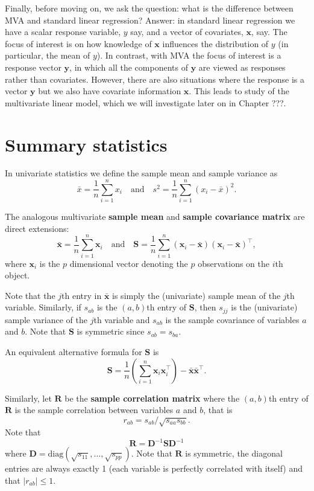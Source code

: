 \documentclass[]{book}
\theoremstyle{definition}
\theoremstyle{definition}
\theoremstyle{definition}
\theoremstyle{remark}
\begin{document}
Finally, before moving on, we ask the question: what is the difference between MVA and standard linear regression? Answer: in standard linear regression we have a scalar response variable, \(y\) say, and a vector of covariates, \(\boldsymbol x\), say. The focus of interest is on how knowledge of \(\boldsymbol x\) influences the distribution of \(y\) (in particular, the mean of \(y\)). In contrast, with MVA the focus of interest is a response vector \(\boldsymbol y\), in which all the components of \(\boldsymbol y\) are viewed as responses rather than covariates. However, there are also situations where the response is a vector \(\boldsymbol y\) but we also have covariate information \(\boldsymbol x\). This leads to study of the multivariate linear model, which we will investigate later on in Chapter ???.

\hypertarget{summary-statistics}{%
\section{Summary statistics}\label{summary-statistics}}

In univariate statistics we define the sample mean and sample variance as
\[ \bar{x} = \frac{1}{n} \sum_{i=1}^n x_i \quad \text{and} \quad s^2 = \frac{1}{n} \sum_{i=1}^n (x_i - \bar{x})^2. \]

The analogous multivariate \textbf{sample mean} and \textbf{sample covariance matrix} are direct extensions:
\[ \bar{\boldsymbol x} = \frac{1}{n} \sum_{i=1}^n \boldsymbol x_i \quad \text{and} \quad \boldsymbol S= \frac{1}{n} \sum_{i=1}^n (\boldsymbol x_i - \bar{\boldsymbol x}) (\boldsymbol x_i - \bar{\boldsymbol x})^\top, \]
where \(\boldsymbol x_i\) is the \(p\) dimensional vector denoting the \(p\) observations on the \(i\)th object.

Note that the \(j\)th entry in \(\bar{\boldsymbol x}\) is simply the (univariate) sample mean of the \(j\)th variable. Similarly, if \(s_{ab}\) is the \((a,b)\)th entry of \(\boldsymbol S\), then \(s_{jj}\) is the (univariate) sample variance of the \(j\)th variable and \(s_{ab}\) is the sample covariance of variables \(a\) and \(b\). Note that \(\boldsymbol S\) is symmetric since \(s_{ab}=s_{ba}\).

An equivalent alternative formula for \(\boldsymbol S\) is
\[\boldsymbol S= \frac{1}{n} \left(\sum_{i=1}^n \boldsymbol x_i \boldsymbol x_i^\top \right)- \bar{\boldsymbol x} \bar{\boldsymbol x}^\top.\]

Similarly, let \(\boldsymbol R\) be the \textbf{sample correlation matrix} where the \((a,b)\)th entry of \(\boldsymbol R\) is the sample correlation between variables \(a\) and \(b\), that is
\[ r_{ab} = s_{ab}/\sqrt{s_{aa}s_{bb}}. \]
Note that
\[ \boldsymbol R= \boldsymbol D^{-1} \boldsymbol S\boldsymbol D^{-1} \]
where \(\boldsymbol D= \text{diag}(\sqrt{s_{11}}, \dots, \sqrt{s_{pp}})\). Note that \(\boldsymbol R\) is symmetric, the diagonal entries are always exactly 1 (each variable is perfectly correlated with itself) and that \(|r_{ab}| \leq 1\).
\end{document}
